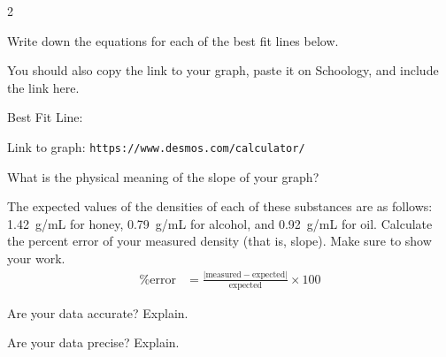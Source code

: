 \documentclass[10pt]{exam}
\begin{document}
\begin{questions}
\begin{multicols}{2}

\end{multicols}


  \question
    Write down the equations for each of the best fit lines below.  

    You should also copy the link to your graph, paste it on Schoology, and include the link here.

    \vspace{3em}

    Best Fit Line:

    \vspace{3em}

    Link to graph: \texttt{https://www.desmos.com/calculator/}\fillin[][10em]

    \vspace{1em}

  \question
    What is the physical meaning of the slope of your graph?
    \vs

  \question
    The expected values of the densities of each of these substances are as follows: 1.42~g/mL for honey, 0.79~g/mL for alcohol, and 0.92~g/mL for oil.  Calculate the percent error of your measured density (that is, slope).  Make sure to show your work.
    \begin{align*}
      \text{\% error} &= 
      \frac{\left| 
        \text{measured} - \text{expected} 
      \right|}{
        \text{expected}
      } 
      \times 100
    \end{align*}
    \vs

  \question
    Are your data accurate? Explain.
    \vs

  \question
    Are your data precise? Explain.
    \vs

\end{questions}
\end{document}

